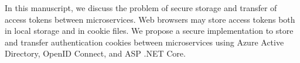 In this manuscript, we discuss the problem of secure storage and transfer of access tokens between microservices.
Web browsers may store access tokens both in local storage and in cookie files.
We propose a secure implementation
to store and transfer authentication cookies between microservices using Azure Active Directory,
OpenID Connect, and ASP .NET Core.